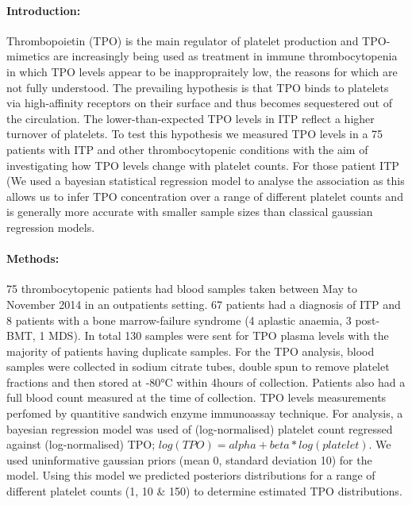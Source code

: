 \documentclass[11pt]{article}
\title{}
\author{George Adams .... Nichola Cooper}
\date{July 2018}
\begin{document}
\maketitle

\paragraph{Introduction:} Thrombopoietin (TPO) is the main regulator of platelet production and TPO-mimetics are increasingly being used as treatment in immune thrombocytopenia in which TPO levels appear to be inappropraitely low, the reasons for which are not fully understood. The prevailing hypothesis is that TPO binds to platelets via high-affinity receptors on their surface and thus becomes sequestered out of the circulation. The lower-than-expected TPO levels in ITP reflect a higher turnover of platelets. To test this hypothesis we measured TPO levels in a 75 patients with ITP and other thrombocytopenic conditions with the aim of investigating how TPO levels change with platelet counts. For those patient ITP (We used a bayesian statistical regression model to analyse the association as this allows us to infer TPO concentration over a range of different platelet counts and is generally more accurate with smaller sample sizes than classical gaussian regression models.

\paragraph{Methods:} 75 thrombocytopenic patients had blood samples taken between May to November 2014 in an outpatients setting. 67 patients had a diagnosis of ITP and 8 patients with a bone marrow-failure syndrome (4 aplastic anaemia, 3 post- BMT, 1 MDS). In total 130 samples were sent for TPO plasma levels with the majority of patients having duplicate samples. For the TPO analysis, blood samples were collected in sodium citrate tubes, double spun to remove platelet fractions and then stored at -80°C within 4hours of collection. Patients also had a full blood count measured at the time of collection. TPO levels measurements perfomed by quantitive sandwich enzyme immunoassay technique. For analysis, a bayesian regression model was used of (log-normalised) platelet count regressed against (log-normalised) TPO; $log(TPO) = alpha + beta*log(platelet)$. We used uninformative gaussian priors (mean 0, standard deviation 10) for the model. Using this model we predicted posteriors distributions for a range of different platelet counts (1, 10 & 150) to determine estimated TPO distributions.
\end{document}
